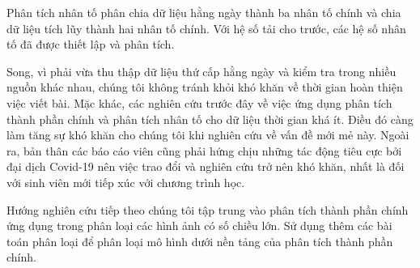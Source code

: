 \documentclass[../thesis.tex]{subfiles}
\begin{document}
Phân tích nhân tố phân chia dữ liệu hằng ngày thành ba nhân tố chính và chia dữ liệu tích lũy thành hai nhân tố chính. Với hệ số tải cho trước, các hệ số nhân tố đã được thiết lập và phân tích.

Song, vì phải vừa thu thập dữ liệu thứ cấp hằng ngày và kiểm tra trong nhiều nguồn khác nhau, chúng tôi không tránh khỏi khó khăn về thời gian hoàn thiện việc viết bài. Mặc khác, các nghiên cứu trước đây về việc ứng dụng phân tích thành phần chính và phân tích nhân tố cho dữ liệu thời gian khá ít. Điều đó càng làm tăng sự khó khăn cho chúng tôi khi nghiên cứu về vấn đề mới mẻ này. Ngoài ra, bản thân các báo cáo viên cũng phải hứng chịu những tác động tiêu cực bởi đại dịch Covid-19 nên việc trao đổi và nghiên cứu trở nên khó khăn, nhất là đối với sinh viên mới tiếp xúc với chương trình học.

Hướng nghiên cứu tiếp theo chúng tôi tập trung vào phân tích thành phần chính ứng dụng trong phân loại các hình ảnh có số chiều lớn. Sử dụng thêm các bài toán phân loại để phân loại mô hình dưới nền tảng của phân tích thành phần chính.
\end{document}
